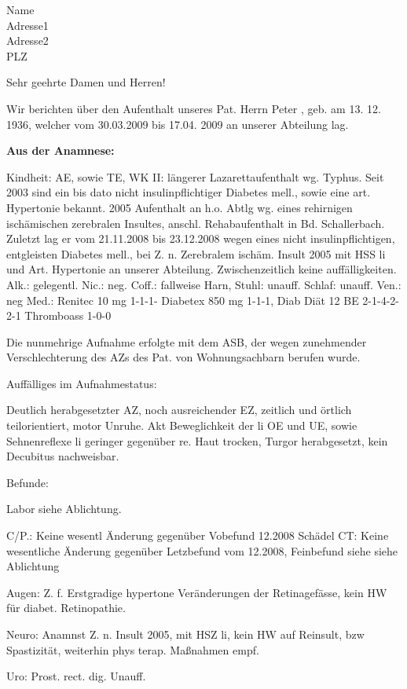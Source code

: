 \documentclass[fromalign=center,fromrule=aftername,fromphone,fromemail,fontsize=10pt,DIV=13]{scrlttr2}
\begin{document}
\begin{letter}{Name\\
Adresse1\\
Adresse2\\
PLZ}


\opening{Sehr geehrte Damen und Herren!}


Wir berichten über den Aufenthalt unseres Pat. Herrn Peter , geb. am 13. 12. 1936, welcher vom 30.03.2009 bis 17.04. 2009 an unserer Abteilung lag.

{\bfseries Aus der Anamnese:}

Kindheit: AE, sowie TE, 
WK II: längerer Lazarettaufenthalt wg. Typhus.
Seit 2003 sind ein bis dato nicht insulinpflichtiger Diabetes mell., sowie eine art. Hypertonie bekannt.
2005 Aufenthalt an h.o. Abtlg wg. eines rehirnigen ischämischen zerebralen Insultes, anschl. Rehabaufenthalt in Bd. Schallerbach.
  Zuletzt lag er vom 21.11.2008 bis 23.12.2008 wegen eines nicht insulinpflichtigen, entgleisten Diabetes mell., bei Z. n. Zerebralem ischäm. Insult 2005 mit HSS li und Art. Hypertonie an unserer Abteilung. 
Zwischenzeitlich keine auffälligkeiten.
Alk.: gelegentl.
Nic.: neg.
Coff.: fallweise
Harn, Stuhl: unauff.
Schlaf: unauff.
Ven.: neg
Med.: Renitec 10 mg 1-1-1-
          Diabetex 850 mg 1-1-1, Diab Diät 12 BE 2-1-4-2-2-1
          Thromboass 1-0-0

 Die nunmehrige Aufnahme erfolgte mit dem ASB, der wegen zunehmender Verschlechterung des AZs des Pat. von Wohnungsachbarn berufen wurde.

Auffälliges im Aufnahmestatus: 

 Deutlich herabgesetzter AZ, noch ausreichender EZ, zeitlich und örtlich teilorientiert, motor Unruhe. Akt Beweglichkeit der li OE und UE, sowie Sehnenreflexe li geringer gegenüber re. Haut trocken, Turgor herabgesetzt, kein Decubitus nachweisbar.

Befunde:

Labor siehe Ablichtung.

C/P.: Keine wesentl Änderung gegenüber Vobefund 12.2008 
Schädel CT: Keine wesentliche Änderung gegenüber Letzbefund vom 12.2008, Feinbefund siehe siehe Ablichtung

Augen: Z. f. Erstgradige hypertone Veränderungen der Retinagefässe, kein HW für diabet. Retinopathie.

Neuro: Anamnst Z. n. Insult 2005, mit HSZ li, kein HW auf Reinsult, bzw Spastizität, weiterhin  phys terap. Maßnahmen empf.

Uro: Prost. rect. dig. Unauff.


\end{letter}
\end{document}
